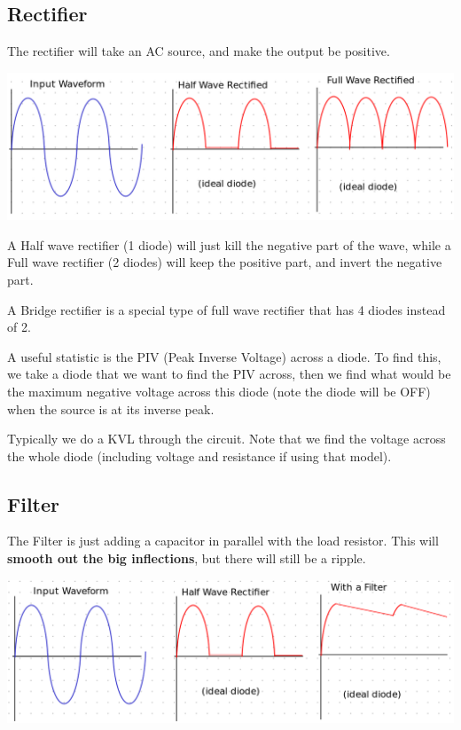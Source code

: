 \documentclass[12pt,letterpaper]{article} \usepackage{amsmath} \usepackage{graphicx} \usepackage[margin=1in]{geometry} \usepackage{longtable}  \usepackage{amssymb}
\begin{document}
	\subsection{Rectifier}
	The rectifier will take an AC source, and make the output be positive.
	\begin{center}
		\includegraphics[width=0.9\linewidth]{rectifier}
	\end{center}
	
	
	A Half wave rectifier (1 diode) will just kill the negative part of the wave, while a Full wave rectifier (2 diodes) will keep the positive part, and invert the negative part. 
	
	A Bridge rectifier is a special type of full wave rectifier that has 4 diodes instead of 2. 
	
	A useful statistic is the PIV (Peak Inverse Voltage) across a diode. To find this, we take a diode that we want to find the PIV across, then we find what would be the maximum negative voltage across this diode (note the diode will be OFF) when the source is at its inverse peak. 
	
	Typically we do a KVL through the circuit. Note that we find the voltage across the whole diode (including voltage and resistance if using that model).
	
	
	\subsection{Filter}
	The Filter is just adding a capacitor in parallel with the load resistor. This will \textbf{smooth out the big inflections}, but there will still be a ripple. 
	\begin{center}
		\includegraphics[width=0.9\linewidth]{filter}
	\end{center}
\end{document}
